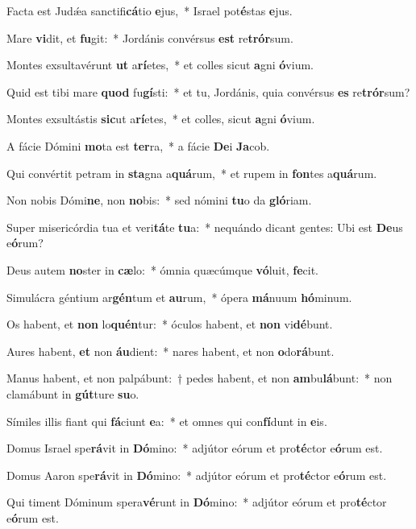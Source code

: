 \item  Facta est Judǽa sanctifi\textbf{cá}tio \textbf{e}jus,~* Israel pot\textbf{é}stas \textbf{e}jus.
\item Mare \textbf{vi}dit, et \textbf{fu}git:~* Jordánis convérsus \textbf{est} re\textbf{trór}sum.
\item Montes exsultavérunt \textbf{ut} a\textbf{rí}etes,~* et colles sicut \textbf{a}gni \textbf{ó}vium.
\item Quid est tibi mare \textbf{quod} fu\textbf{gí}sti:~* et tu, Jordánis, quia convérsus \textbf{es} re\textbf{trór}sum?
\item Montes exsultástis \textbf{sic}ut a\textbf{rí}etes,~* et colles, sicut \textbf{a}gni \textbf{ó}vium.
\item A fácie Dómini \textbf{mo}ta est \textbf{ter}ra,~* a fácie \textbf{De}i \textbf{Ja}cob.
\item Qui convértit petram in \textbf{sta}gna a\textbf{quá}rum,~* et rupem in \textbf{fon}tes a\textbf{quá}rum.
\item Non nobis Dómi\textbf{ne}, non \textbf{no}bis:~* sed nómini \textbf{tu}o da \textbf{gló}riam.
\item Super misericórdia tua et veri\textbf{tá}te \textbf{tu}a:~* nequándo dicant gentes: Ubi est \textbf{De}us e\textbf{ó}rum?
\item Deus autem \textbf{no}ster in \textbf{cæ}lo:~* ómnia quæcúmque \textbf{vó}luit, \textbf{fe}cit.
\item Simulácra géntium ar\textbf{gén}tum et \textbf{au}rum,~* ópera \textbf{má}nuum \textbf{hó}minum.
\item Os habent, et \textbf{non} lo\textbf{quén}tur:~* óculos habent, et \textbf{non} vi\textbf{dé}bunt.
\item Aures habent, \textbf{et} non \textbf{áu}dient:~* nares habent, et non \textbf{o}do\textbf{rá}bunt.
\item Manus habent, et non palpábunt:~† pedes habent, et non \textbf{am}bu\textbf{lá}bunt:~* non clamábunt in \textbf{gút}ture \textbf{su}o.
\item Símiles illis fiant qui \textbf{fá}ciunt \textbf{e}a:~* et omnes qui con\textbf{fí}dunt in \textbf{e}is.
\item Domus Israel spe\textbf{rá}vit in \textbf{Dó}mino:~* adjútor eórum et pro\textbf{té}ctor e\textbf{ó}rum est.
\item Domus Aaron spe\textbf{rá}vit in \textbf{Dó}mino:~* adjútor eórum et pro\textbf{té}ctor e\textbf{ó}rum est.
\item Qui timent Dóminum spera\textbf{vé}runt in \textbf{Dó}mino:~* adjútor eórum et pro\textbf{té}ctor e\textbf{ó}rum est.
